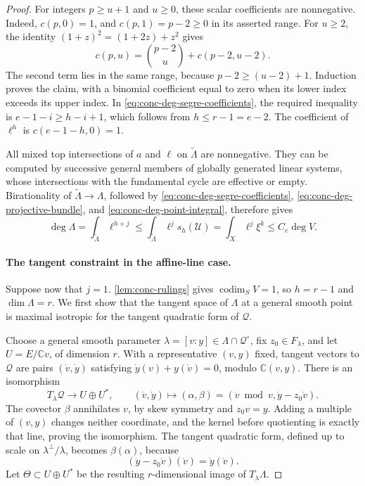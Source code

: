\begin{proof}
For integers $p\ge u+1$ and $u\ge0$, these scalar coefficients are nonnegative.  Indeed, $c(p,0)=1$, and $c(p,1)=p-2\ge0$ in its asserted range.  For $u\ge2$, the identity $(1+z)^2=(1+2z)+z^2$ gives
\[
 c(p,u)=\binom{p-2}{u}+c(p-2,u-2).
\]
The second term lies in the same range, because $p-2\ge(u-2)+1$.  Induction proves the claim, with a binomial coefficient equal to zero when its lower index exceeds its upper index.  In \eqref{eq:conc-deg-segre-coefficients}, the required inequality is $e-1-i\ge h-i+1$, which follows from $h\le r-1=e-2$.  The coefficient of $\ell^h$ is $c(e-1-h,0)=1$.

All mixed top intersections of $a$ and $\ell$ on $\widetilde\Lambda$ are nonnegative.  They can be computed by successive general members of globally generated linear systems, whose intersections with the fundamental cycle are effective or empty.  Birationality of $\widetilde\Lambda\to\Lambda$, followed by \eqref{eq:conc-deg-segre-coefficients}, \eqref{eq:conc-deg-projective-bundle}, and \eqref{eq:conc-deg-point-integral}, therefore gives
\begin{equation}
 \deg\Lambda
 =\int_{\widetilde\Lambda}\ell^{h+j}
 \le\int_{\widetilde\Lambda}\ell^j s_h(\mathcal{U})
 =\int_X\ell^j\xi^k
 \le C_e\deg V.
 \label{eq:conc-deg-bound}
\end{equation}

\paragraph{The tangent constraint in the affine-line case.}
Suppose now that $j=1$.  \cref{lem:conc-rulings} gives $\operatorname{codim}_S V=1$, so $h=r-1$ and $\dim\Lambda=r$.  We first show that the tangent space of $\Lambda$ at a general smooth point is maximal isotropic for the tangent quadratic form of $\mathcal{Q}$.

Choose a general smooth parameter $\lambda=[v:y]\in \Lambda\cap\mathcal{Q}^\circ$, fix $z_0\in F_\lambda$, and let $U=E/\mathbb{C}v$, of dimension $r$.  With a representative $(v,y)$ fixed, tangent vectors to $\mathcal{Q}$ are pairs $(\dot v,\dot y)$ satisfying $\dot y(v)+y(\dot v)=0$, modulo $\mathbb{C}(v,y)$. There is an isomorphism
\begin{equation}
 T_\lambda\mathcal{Q}\longrightarrow U\oplus U^*,
 \qquad
 (\dot v,\dot y)\longmapsto
 (\alpha,\beta)=(\dot v\bmod v,\dot y-z_0\dot v).
 \label{eq:conc-deg-tangent-coordinates}
\end{equation}
The covector $\beta$ annihilates $v$, by skew symmetry and $z_0v=y$.  Adding a multiple of $(v,y)$ changes neither coordinate, and the kernel before quotienting is exactly that line, proving the isomorphism.  The tangent quadratic form, defined up to scale on $\lambda^\perp/\lambda$, becomes $\beta(\alpha)$, because
\[
 (\dot y-z_0\dot v)(\dot v)=\dot y(\dot v).
\]
Let $\Theta\subset U\oplus U^*$ be the resulting $r$-dimensional image of $T_\lambda\Lambda$.


\end{proof}
